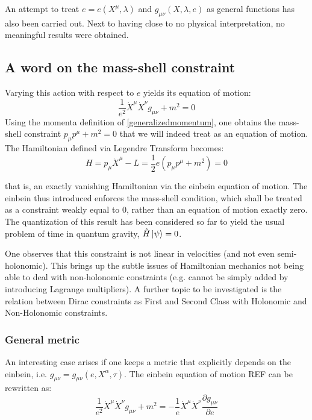\documentclass[a4paper,10pt]{article}
\numberwithin{equation}{section}
\begin{document}
An attempt to treat $e = e(X^{\mu},\lambda)$ and $ g_{\mu \nu}(X,\lambda,e)$ as general functions has also been carried out. Next to having close to no physical interpretation, no meaningful results were obtained.





\subsection{A word on the mass-shell constraint}

Varying this action with respect to $e$ yields its equation of motion:
\begin{equation}
    \frac{1}{e^2} \dot{X}^{\mu}\dot{X}^{\nu}g_{\mu \nu} + m^2 =0
    \label{alleom}
\end{equation}
Using the momenta definition of \ref{generalizedmomentum}, one obtains the mass-shell constraint $p_\mu p^\mu + m^2 = 0$ that we will indeed treat as an equation of motion. The Hamiltonian defined via Legendre Transform becomes:
\begin{equation}
    H = p_\mu \dot{X}^\mu - L = \frac{1}{2}e(p_\mu p^\mu + m^2) = 0
    \label{simpleHamiltonian}
\end{equation}

that is, an exactly vanishing Hamiltonian via the einbein equation of motion. The einbein thus introduced enforces the mass-shell condition, which shall be treated as a constraint weakly equal to 0, rather than an equation of motion exactly zero. The quantization of this result has been considered so far to yield the usual problem of time in quantum gravity, $\hat{H} \ket{\psi} = 0$.

One observes that this constraint is not linear in velocities (and not even semi-holonomic). This brings up the subtle issues of Hamiltonian mechanics not being able to deal with non-holonomic constraints (e.g. cannot be simply added by introducing Lagrange multipliers). A further topic to be investigated is the relation between Dirac constraints as First and Second Class with Holonomic and Non-Holonomic constraints.








\iffalse
\subsubsection{General metric}

An interesting case arises if one keeps a metric that explicitly depends on the einbein, i.e. $g_{\mu \nu} = g_{\mu \nu}(e, X^\alpha, \tau)$. The einbein equation of motion REF can be rewritten as:
\begin{equation}
    \frac{1}{e^2}\dot{X}^\mu \dot{X}^\nu g_{\mu \nu} + m^2 = - \frac{1}{e}\dot{X}^\mu \dot{X}^\nu \frac{\partial g_{\mu \nu}}{\partial e}
\end{equation}
\end{document}
